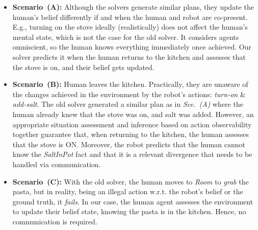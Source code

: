 \documentclass[letterpaper]{article} %
\begin{document}
\begin{itemize}
    \item \textbf{Scenario~(A):} 
    Although the solvers generate similar plans, they update the human's belief differently if and when the human and robot are co-present. E.g., turning on the stove ideally (realistically) does not affect the human's mental state, which is not the case for the old solver. It considers agents omniscient, so the human knows everything immediately once achieved. 
    Our solver predicts it when the human returns to the kitchen and assesses that the stove is {\sc on}, and their belief gets updated.
    \item \textbf{Scenario~(B):} Human leaves the kitchen. Practically, they are unaware of the changes achieved in the environment by the robot's actions: {\em turn-on} \& {\em add-salt}. The old solver generated a similar plan as in {\em Sce.~(A)} where the human already knew that the stove was {\sc on}, and salt was added.
    However, an appropriate situation assessment and inference based on action observability together guarantee that, when returning to the kitchen, the human assesses that the stove is {\sc ON}. Moreover, the robot predicts that the human cannot know the \textit{SaltInPot} fact and that it is a relevant divergence that needs to be handled via communication. 
    \item
    \textbf{Scenario~(C):}
    With the old solver, the human moves to \textit{Room} to \textit{grab} the pasta, but in reality, being an illegal action w.r.t. the robot's belief or the ground truth, it \textit{fails}. 
    In our case, the human agent assesses the environment to update their belief state, knowing the pasta is in the kitchen. 
    Hence, no communication is required.
\end{itemize}
\end{document}
